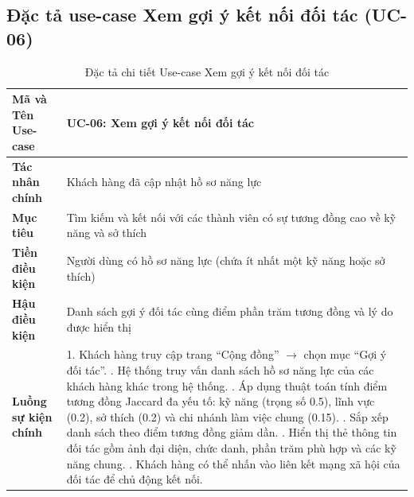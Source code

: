 \subsection{Đặc tả use-case Xem gợi ý kết nối đối tác (UC-06)}
\begin{table}[H]
\centering
\small
\renewcommand{\arraystretch}{1.2}
\begin{tabular}{|p{3.6cm}|p{10.4cm}|}
\hline
\textbf{Mã và Tên Use-case} & \textbf{UC-06: Xem gợi ý kết nối đối tác} \\ \hline
\textbf{Tác nhân chính} & Khách hàng đã cập nhật hồ sơ năng lực \\ \hline
\textbf{Mục tiêu} & Tìm kiếm và kết nối với các thành viên có sự tương đồng cao về kỹ năng và sở thích \\ \hline
\textbf{Tiền điều kiện} & Người dùng có hồ sơ năng lực (chứa ít nhất một kỹ năng hoặc sở thích) \\ \hline
\textbf{Hậu điều kiện} & Danh sách gợi ý đối tác cùng điểm phần trăm tương đồng và lý do được hiển thị \\ \hline
\textbf{Luồng sự kiện chính} & 
1. Khách hàng truy cập trang ``Cộng đồng'' $\rightarrow$ chọn mục ``Gợi ý đối tác''. \newline
2. Hệ thống truy vấn danh sách hồ sơ năng lực của các khách hàng khác trong hệ thống. \newline
3. Áp dụng thuật toán tính điểm tương đồng Jaccard đa yếu tố: kỹ năng (trọng số 0.5), lĩnh vực (0.2), sở thích (0.2) và chi nhánh làm việc chung (0.15). \newline
4. Sắp xếp danh sách theo điểm tương đồng giảm dần. \newline
5. Hiển thị thẻ thông tin đối tác gồm ảnh đại diện, chức danh, phần trăm phù hợp và các kỹ năng chung. \newline
6. Khách hàng có thể nhấn vào liên kết mạng xã hội của đối tác để chủ động kết nối. \\ \hline
\end{tabular}
\caption{Đặc tả chi tiết Use-case Xem gợi ý kết nối đối tác}
\label{tab:uc_spec_06}
\end{table}

